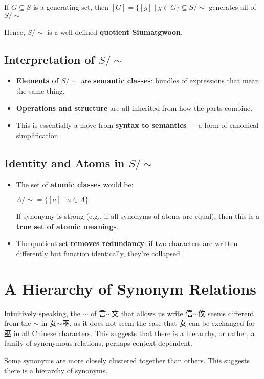 If $G\subseteq S$ is a generating set, then $[G]=\{[g]\mid g\in G\}\subseteq S/\sim$ generates all of $S/\sim$

Hence, $S/\sim$ is a well-defined \textbf{quotient Siumatgwoon}.

\subsection{Interpretation of $S/\sim$}

\begin{itemize}
\item \textbf{Elements of $S/\sim$} are \textbf{semantic classes}: bundles of expressions that mean the same thing.
\item \textbf{Operations and structure} are all inherited from how the parts combine.
\item This is essentially a move from \textbf{syntax to semantics} — a form of canonical simplification.
\end{itemize}

\subsection{Identity and Atoms in $S/\sim$}

\begin{itemize}
\item The set of \textbf{atomic classes} would be:

$A/\sim=\{[a]\mid a\in A\}$

If synonymy is strong (e.g., if all synonyms of atoms are equal), then this is a \textbf{true set of atomic meanings}.

\item The quotient set \textbf{removes redundancy}: if two characters are written differently but function identically, they're collapsed.
\end{itemize}

\section{A Hierarchy of Synonym Relations}

Intuitively speaking, the $\sim$ of 言$\sim$文 that allows us write 信$\sim$伩 seems different from the $\sim$ in 女$\sim$巫, as it does not seem the case that 女 can be exchanged for 巫 in all Chinese characters. This suggests that there is a hierarchy, or rather, a family of synonymous relations, perhaps context dependent. 

Some synonyms are more closely clustered together than others. This suggests there is a hierarchy of synonyms.
